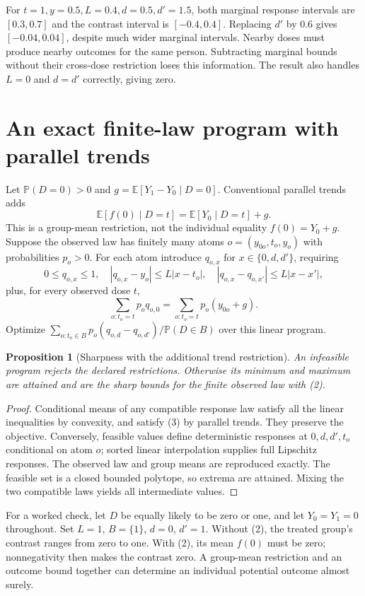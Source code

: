 \documentclass[11pt,a4paper]{article}
\newtheorem{proposition}[theorem]{Proposition}
\newcommand{\E}{\mathbb E}
\newcommand{\Prb}{\mathbb P}
\begin{document}
For $t=1,y=0.5,L=0.4,d=0.5,d'=1.5$, both marginal response intervals are $[0.3,0.7]$ and the contrast interval is $[-0.4,0.4]$. Replacing $d'$ by $0.6$ gives $[-0.04,0.04]$, despite much wider marginal intervals. Nearby doses must produce nearby outcomes for the same person. Subtracting marginal bounds without their cross-dose restriction loses this information. The result also handles $L=0$ and $d=d'$ correctly, giving zero.

\section{An exact finite-law program with parallel trends}
Let $\Prb(D=0)>0$ and $g=\E[Y_1-Y_0\mid D=0]$. Conventional parallel trends adds
\[
 \E[f(0)\mid D=t]=\E[Y_0\mid D=t]+g. \tag{2}
\]
This is a group-mean restriction, not the individual equality $f(0)=Y_0+g$.
Suppose the observed law has finitely many atoms $o=(y_{0o},t_o,y_o)$ with probabilities $p_o>0$. For each atom introduce $q_{o,x}$ for $x\in\{0,d,d'\}$, requiring
\[
 0\le q_{o,x}\le1,\quad |q_{o,x}-y_o|\le L|x-t_o|,\quad
 |q_{o,x}-q_{o,x'}|\le L|x-x'|,
\]
plus, for every observed dose $t$,
\[
 \sum_{o:t_o=t}p_o q_{o,0}=\sum_{o:t_o=t}p_o(y_{0o}+g). \tag{3}
\]
Optimize $\sum_{o:t_o\in B}p_o(q_{o,d}-q_{o,d'})/\Prb(D\in B)$ over this linear program.

\begin{proposition}[Sharpness with the additional trend restriction]
An infeasible program rejects the declared restrictions. Otherwise its minimum and maximum are attained and are the sharp bounds for the finite observed law with (2).
\end{proposition}
\begin{proof}
Conditional means of any compatible response law satisfy all the linear inequalities by convexity, and satisfy (3) by parallel trends. They preserve the objective. Conversely, feasible values define deterministic responses at $0,d,d',t_o$ conditional on atom $o$; sorted linear interpolation supplies full Lipschitz responses. The observed law and group means are reproduced exactly. The feasible set is a closed bounded polytope, so extrema are attained. Mixing the two compatible laws yields all intermediate values.
\end{proof}

For a worked check, let $D$ be equally likely to be zero or one, and let $Y_0=Y_1=0$ throughout. Set $L=1$, $B=\{1\}$, $d=0$, $d'=1$. Without (2), the treated group's contrast ranges from zero to one. With (2), its mean $f(0)$ must be zero; nonnegativity then makes the contrast zero. A group-mean restriction and an outcome bound together can determine an individual potential outcome almost surely.
\end{document}
